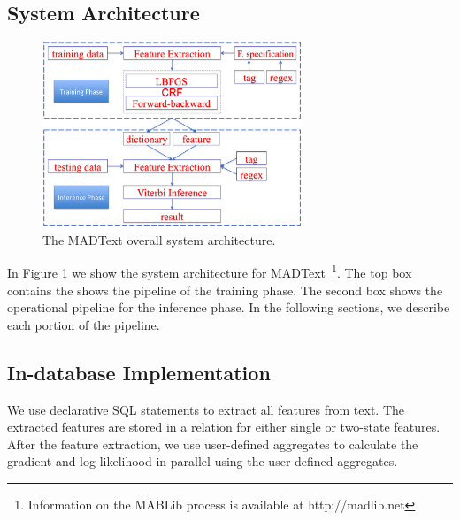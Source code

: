 \documentclass[11pt,letterpaper]{article}
\begin{document}
\subsection{System Architecture}
\begin{figure}
\centering
\includegraphics[height=15em]{system.png}
\caption{The MADText overall system architecture.}
\label{fig:systemarch}
\end{figure}

In Figure \ref{fig:systemarch} we show the system architecture for MADText~\footnote{Information on the MABLib process is available at http://madlib.net}. 
The top box contains the shows  the pipeline of the training phase. 
The second box shows the operational pipeline for the inference phase.
In the following sections, we describe each portion of the pipeline.

\subsection{In-database Implementation}
We use declarative SQL statements to extract all features from text.
The extracted features are stored in a relation for either single or two-state features.
After the feature extraction, we use user-defined aggregates to calculate the gradient and log-likelihood in parallel using the user defined aggregates.
\end{document}
